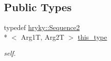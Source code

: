 \subsection*{Public Types}
\begin{DoxyCompactItemize}
\item 
\hypertarget{classhryky_1_1_sequence2_ab80d86270054fa12859ed8019bae8151}{typedef \hyperlink{classhryky_1_1_sequence2}{hryky\-::\-Sequence2}\\*
$<$ Arg1\-T, Arg2\-T $>$ \hyperlink{classhryky_1_1_sequence2_ab80d86270054fa12859ed8019bae8151}{this\-\_\-type}}\label{classhryky_1_1_sequence2_ab80d86270054fa12859ed8019bae8151}

\begin{DoxyCompactList}\small\item\em self. \end{DoxyCompactList}\end{DoxyCompactItemize}
